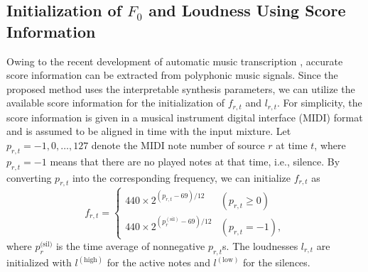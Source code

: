 \documentclass{article}
\def\psil{p^{(\text{sil})}}
\begin{document}
\subsection{Initialization of $F_0$ and Loudness Using Score Information}\label{sec:param_init}
Owing to the recent development of automatic music transcription \cite{B1,B2,B3}, accurate score information can be extracted from polyphonic music signals.
Since the proposed method uses the interpretable synthesis parameters, we can utilize the available score information for the initialization of $f_{r,t}$ and $l_{r,t}$.
For simplicity, the score information is given in a musical instrument digital interface (MIDI) format and is assumed to be aligned in time with the input mixture.
Let $p_{r,t}=-1,0,\ldots,127$ denote the MIDI note number of source $r$ at time $t$, where $p_{r,t}=-1$ means that there are no played notes at that time, i.e., silence.
By converting $p_{r,t}$ into the corresponding frequency, we can initialize $f_{r,t}$ as
\begin{equation}
    f_{r,t} = 
    \begin{cases}
    440\times 2^{(p_{r,t}-69)/12} & (p_{r,t}\geq0) \\
    440\times 2^{(\psil_r-69)/12} & (p_{r,t}=-1),
    \end{cases}
\end{equation}
where $p_r^{\text{(sil)}}$ is the time average of nonnegative $p_{r,t}$s.
The loudnesses $l_{r,t}$ are initialized with $l^{(\text{high})}$ for the active notes and $l^{(\text{low})}$ for the silences.
\end{document}
